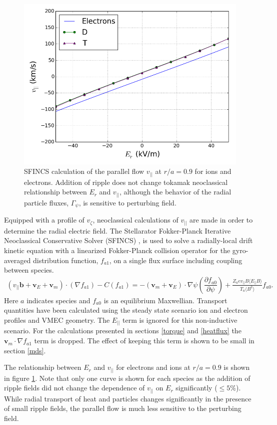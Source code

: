 \documentclass{article}
\newcommand{\partder}[2]{\dfrac{\partial  #1}{\partial  #2}} %
\begin{document}
\begin{figure}[h!]
\centering
\includegraphics[width=.7\textwidth]{Er_flow.png}
\caption{\label{fig:Er_flow} SFINCS calculation of the parallel flow $v_{||}$ at $r/a = 0.9$ for ions and electrons. Addition of ripple does not change tokamak neoclassical relationship between $E_r$ and $v_{||}$, although the behavior of the radial particle fluxes, $\Gamma_{\psi}$, is sensitive to perturbing field.}
\end{figure}

Equipped with a profile of $v_{\zeta}$, neoclassical calculations of $v_{||}$ are made in order to determine the radial electric field. The Stellarator Fokker-Planck Iterative Neoclassical Conservative Solver (SFINCS) \cite{Landreman2014}, is used to solve a radially-local drift kinetic equation with a linearized Fokker-Planck collision operator for the gyro-averaged distribution function, $f_{a1}$, on a single flux surface including coupling between species. 
\begin{gather}
( v_{||} \bm{b} + \bm{v}_E + \bm{v}_m) \cdot (\nabla f_{a1})  - C(f_{a1}) = - (\bm{v}_{m} + \bm{v}_E) \cdot \nabla \psi \left( \partder{f_{a0}}{\psi} \right) + \frac{Z_a e v_{||} B \langle E_{||} B \rangle}{T_a \langle B^2 \rangle } f_{a0}.
\end{gather} \label{kineticequation}
\hspace{-1mm}Here $a$ indicates species and $f_{a0}$ is an equilibrium Maxwellian. Transport quantities have been calculated using the steady state scenario ion and electron profiles and VMEC geometry. The $E_{||}$ term is ignored for this non-inductive scenario. For the calculations presented in sections \ref{torque} and \ref{heatflux} the $\bm{v}_m \cdot \nabla f_{a1}$ term is dropped. The effect of keeping this term is shown to be small in section \ref{mds}.

The relationship between $E_r$ and $v_{||}$ for electrons and ions at $r/a = 0.9$ is shown in figure \ref{fig:Er_flow}. Note that only one curve is shown for each species as the addition of ripple fields did not change the dependence of $v_{||}$ on $E_r$ significantly ($\leq 5 \%$). While radial transport of heat and particles changes significantly in the presence of small ripple fields, the parallel flow is much less sensitive to the perturbing field. 
\end{document}
